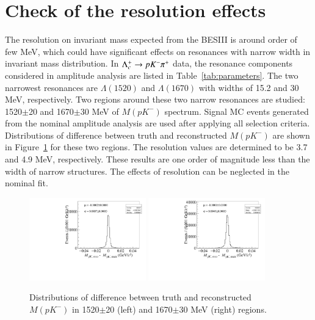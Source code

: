 \clearpage
\section{Check of the resolution effects}
\label{app:resolution}
The resolution on invariant mass expected from the BESIII is around order of few MeV, which could have significant effects on resonances with narrow width in invariant mass distribution. In $\Lambda_{c}^{+} \rightarrow pK^-\pi^+$ data, the resonance components considered in amplitude analysis are listed in Table~\ref{tab:parameters}. The two narrowest resonances are $\Lambda(1520)$ and $\Lambda(1670)$ with widths of 15.2 and 30 MeV, respectively. Two regions around these two narrow resonances are studied: 1520$\pm$20 and 1670$\pm$30 MeV of $M(pK^-)$ spectrum. Signal MC events generated from the nominal amplitude analysis are used after applying all selection criteria. %
Distributions of difference between truth and reconstructed $M(pK^-)$ are shown in Figure~\ref{fig:resolution} for these two regions. The resolution values are determined to be 3.7 and 4.9 MeV, respectively. These results are one order of magnitude less than the width of narrow structures. The effects of resolution can be neglected in the nominal fit.

\begin{figure}[h]\centering
    \includegraphics[width=0.45\textwidth]{figure/app_resolution/m_pK_region1.pdf}
    \includegraphics[width=0.45\textwidth]{figure/app_resolution/m_pK_region2.pdf}
    \caption{Distributions of difference between truth and reconstructed $M(pK^-)$ in 1520$\pm$20 (left) and 1670$\pm$30 MeV (right) regions.}
\label{fig:resolution} 
\end{figure}